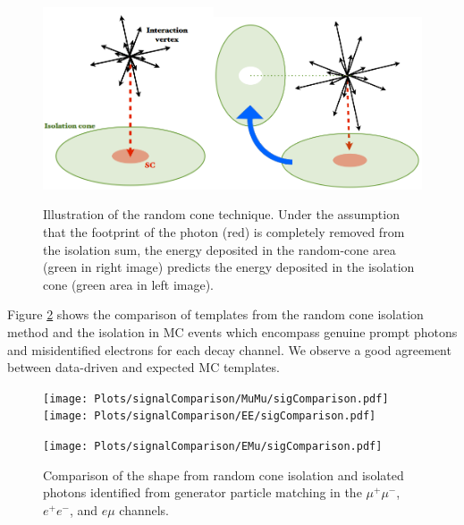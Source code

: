 \begin{figure} 
\begin{center}
\includegraphics[width=0.45\textwidth]{Figures/RandomCone1.png}\includegraphics[width=0.55\textwidth]{Figures/RandomCone2.png}
\end{center}
\caption{Illustration of the random cone technique. Under the assumption that the footprint of the photon (red) is completely removed from the isolation sum, the energy deposited in the random-cone area (green in right image) predicts the energy deposited in the isolation cone (green area in left image). \cite{MarcoThesis}}
\label{fig-RandomConeIsolation}
\end{figure}

Figure \ref{fig-signalComparison} shows the comparison of templates from the random cone isolation method and the isolation in MC events which encompass genuine prompt photons and misidentified electrons for each decay channel. We observe a good agreement between data-driven and expected MC templates.   

\begin{figure}
\texttt{[image: Plots/signalComparison/MuMu/sigComparison.pdf]}
\texttt{[image: Plots/signalComparison/EE/sigComparison.pdf]}
\begin{center}
\texttt{[image: Plots/signalComparison/EMu/sigComparison.pdf]}
\end{center}
\caption{Comparison of the shape from random cone isolation and isolated photons identified from generator particle matching in the $\mu^{+}\mu^{-}$, $e^{+}e^{-}$, and $e\mu$ channels.}
\label{fig-signalComparison}
\end{figure}

